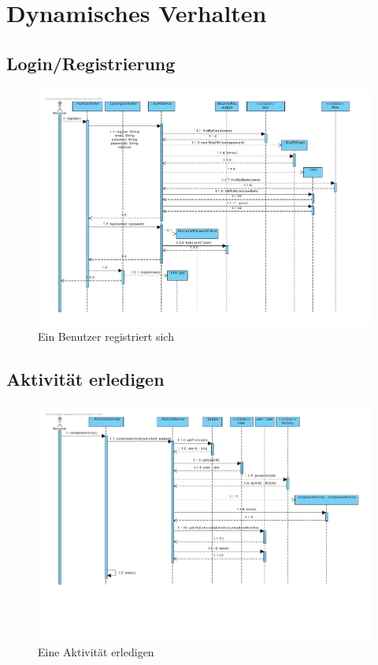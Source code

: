 ﻿\section{Dynamisches Verhalten}

\subsection{Login/Registrierung}

\begin{figure}[H]
  \centering
  \includegraphics[width=16cm, trim= 1cm 1cm 1cm 1cm, clip, angle=90]{gfx/registrieren}
  \caption{Ein Benutzer registriert sich}
\end{figure}


\subsection{Aktivität erledigen}

\begin{figure}[H]
  \centering
  \includegraphics[width=16cm, trim= 1cm 4cm 1cm 1cm, clip,
  angle=90]{gfx/aktivitaet_erledigen}
  \caption{Eine Aktivität erledigen}
\end{figure}

